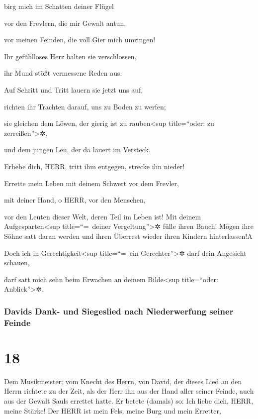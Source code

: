 birg mich im Schatten deiner Flügel

vor den Frevlern, die mir Gewalt antun,

vor meinen Feinden, die voll Gier mich umringen!

Ihr gefühlloses Herz halten sie verschlossen,

ihr Mund stößt vermessene Reden aus.

Auf Schritt und Tritt lauern sie jetzt uns auf,

richten ihr Trachten darauf, uns zu Boden zu werfen;

sie gleichen dem Löwen, der gierig ist zu
rauben\textless sup title=``oder: zu zerreißen''\textgreater✲,

und dem jungen Leu, der da lauert im Versteck.

Erhebe dich, HERR, tritt ihm entgegen, strecke ihn
nieder!

Errette mein Leben mit deinem Schwert vor dem Frevler,

mit deiner Hand, o HERR, vor den Menschen,

vor den Leuten dieser Welt, deren Teil im Leben ist! Mit deinem
Aufgesparten\textless sup title=``=~deiner Vergeltung''\textgreater✲
fülle ihren Bauch! Mögen ihre Söhne satt daran werden und ihren Überrest
wieder ihren Kindern hinterlassen!{A}

Doch ich in Gerechtigkeit\textless sup title=``=~ein
Gerechter''\textgreater✲ darf dein Angesicht schauen,

darf satt mich sehn beim Erwachen an deinem Bilde\textless sup
title=``oder: Anblick''\textgreater✲.

\hypertarget{davids-dank--und-siegeslied-nach-niederwerfung-seiner-feinde}{%
\subsubsection{Davids Dank- und Siegeslied nach Niederwerfung seiner
Feinde}\label{davids-dank--und-siegeslied-nach-niederwerfung-seiner-feinde}}

\hypertarget{section-17}{%
\section{18}\label{section-17}}

Dem Musikmeister; vom Knecht des Herrn, von David, der
dieses Lied an den Herrn richtete zu der Zeit, als der Herr ihn aus der
Hand aller seiner Feinde, auch aus der Gewalt Sauls errettet hatte. Er
betete (damals) so: Ich liebe dich, HERR, meine Stärke!
Der HERR ist mein Fels, meine Burg und mein Erretter,

